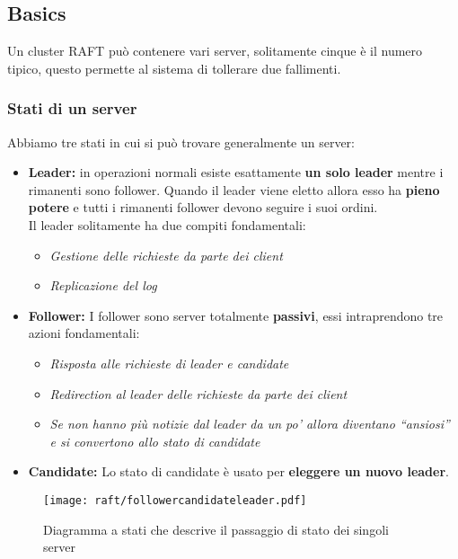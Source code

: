 \subsection{Basics}
Un cluster RAFT può contenere vari server, solitamente cinque è il numero tipico, questo permette al sistema di tollerare due fallimenti.
  \subsubsection{Stati di un server}
  Abbiamo tre stati in cui si può trovare generalmente un server:
  \begin{itemize}
    \item{\textbf{Leader:}}
    in operazioni normali esiste esattamente \textbf{un solo leader} mentre i rimanenti sono follower. Quando il leader viene eletto allora esso ha \textbf{pieno potere} e tutti i rimanenti follower devono seguire i suoi ordini.\\
    Il leader solitamente ha due compiti fondamentali:
    \begin{itemize}
      \item{\emph{Gestione delle richieste da parte dei client}} 
      \item{\emph{Replicazione del log}}
    \end{itemize}
    \item{\textbf{Follower:}}
    I follower sono server totalmente \textbf{passivi}, essi intraprendono tre azioni fondamentali: 
    \begin{itemize}
      \item{\emph{Risposta alle richieste di leader e candidate}}
      \item{\emph{Redirection al leader delle richieste da parte dei client}}
      \item{\emph{Se non hanno più notizie dal leader da un po' allora diventano ``ansiosi'' e si convertono allo stato di candidate}}
    \end{itemize}
    \item{\textbf{Candidate:}}
    Lo stato di candidate è usato per \textbf{eleggere un nuovo leader}.
  \end{itemize}

  \begin{figure}[H]
    \centering
    \texttt{[image: raft/followercandidateleader.pdf]}
    \caption{Diagramma a stati che descrive il passaggio di stato dei singoli server}
    \label{fig:figure2}
  \end{figure}

